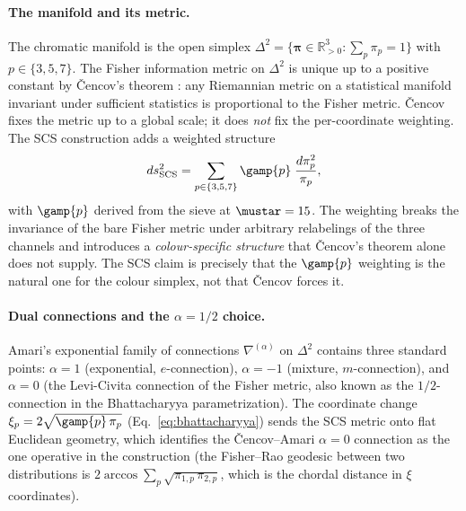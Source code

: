 \documentclass[12pt,a4paper]{article}
\begin{document}
\paragraph{The manifold and its metric.}
The chromatic manifold is the open simplex
$\Delta^2 = \{\bm{\pi} \in \mathbb{R}^3_{>0} : \sum_p \pi_p = 1\}$
with $p \in \{3, 5, 7\}$. The Fisher information metric on
$\Delta^2$ is unique up to a positive constant by \v{C}encov's theorem
\cite{cencov1982}: any Riemannian metric on a statistical manifold
invariant under sufficient statistics is proportional to the Fisher
metric. \v{C}encov fixes the metric up to a global scale; it does
\emph{not} fix the per-coordinate weighting. The SCS construction
adds a weighted structure
\begin{equation}
  ds^2_{\mathrm{SCS}}
  = \sum_{p \in \{3,5,7\}} \gamp{p}\;\frac{d\pi_p^2}{\pi_p},
  \label{eq:scs_metric}
\end{equation}
with $\gamp{p}$ derived from the sieve at $\mustar = 15$. The
weighting breaks the invariance of the bare Fisher metric under
arbitrary relabelings of the three channels and introduces a
\emph{colour-specific structure} that \v{C}encov's theorem alone does
not supply. The SCS claim is precisely that the $\gamp{p}$ weighting
is the natural one for the colour simplex, not that \v{C}encov forces
it.

\paragraph{Dual connections and the $\alpha = 1/2$ choice.}
Amari's exponential family of connections $\nabla^{(\alpha)}$ on
$\Delta^2$ contains three standard points: $\alpha = 1$ (exponential,
$e$-connection), $\alpha = -1$ (mixture, $m$-connection), and
$\alpha = 0$ (the Levi-Civita connection of the Fisher metric, also
known as the $1/2$-connection in the Bhattacharyya parametrization).
The coordinate change $\xi_p = 2\sqrt{\gamp{p}\,\pi_p}$
(Eq.~\eqref{eq:bhattacharyya}) sends the SCS metric onto flat
Euclidean geometry, which identifies the \v{C}encov--Amari
$\alpha = 0$ connection as the one operative in the construction
(the Fisher--Rao geodesic between two distributions is
$2 \arccos \sum_p \sqrt{\pi_{1,p}\,\pi_{2,p}}$, which is the chordal
distance in $\xi$ coordinates).
\end{document}
